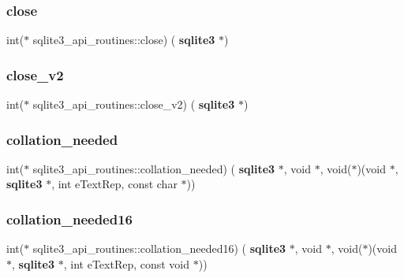 \subsubsection{close}
{\footnotesize\ttfamily int($\ast$ sqlite3\+\_\+api\+\_\+routines\+::close) (\textbf{ sqlite3} $\ast$)}

\mbox{\label{structsqlite3__api__routines_abb98b8486cbe7d739b8840d3d90baa30}} 
\subsubsection{close\_v2}
{\footnotesize\ttfamily int($\ast$ sqlite3\+\_\+api\+\_\+routines\+::close\+\_\+v2) (\textbf{ sqlite3} $\ast$)}

\mbox{\label{structsqlite3__api__routines_a4ecc8645b639cabe1fb630aceaec9017}} 
\subsubsection{collation\_needed}
{\footnotesize\ttfamily int($\ast$ sqlite3\+\_\+api\+\_\+routines\+::collation\+\_\+needed) (\textbf{ sqlite3} $\ast$, void $\ast$, void($\ast$)(void $\ast$, \textbf{ sqlite3} $\ast$, int e\+Text\+Rep, const char $\ast$))}

\mbox{\label{structsqlite3__api__routines_aa035538977ec61fe6df923b78db33962}} 
\subsubsection{collation\_needed16}
{\footnotesize\ttfamily int($\ast$ sqlite3\+\_\+api\+\_\+routines\+::collation\+\_\+needed16) (\textbf{ sqlite3} $\ast$, void $\ast$, void($\ast$)(void $\ast$, \textbf{ sqlite3} $\ast$, int e\+Text\+Rep, const void $\ast$))}

\mbox{\label{structsqlite3__api__routines_aea28365a58adb937fbdf3983fe080e1a}} 
